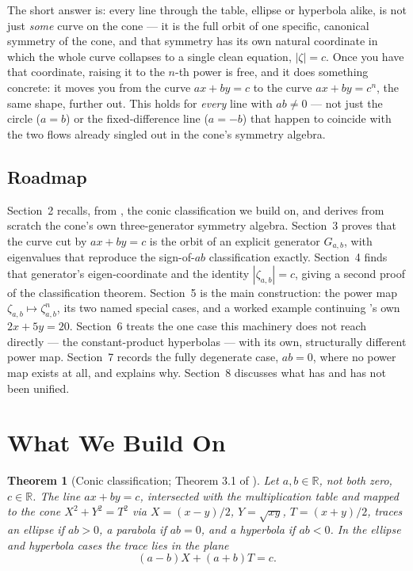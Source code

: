 \documentclass[11pt]{amsart}
\newtheorem{theorem}{Theorem}[section]
\theoremstyle{remark}
\begin{document}
The short answer is: every line through the table, ellipse or hyperbola alike, is not just \emph{some} curve on the cone --- it is the full orbit of one specific, canonical symmetry of the cone, and that symmetry has its own natural coordinate in which the whole curve collapses to a single clean equation, $|\zeta|=c$. Once you have that coordinate, raising it to the $n$-th power is free, and it does something concrete: it moves you from the curve $ax+by=c$ to the curve $ax+by=c^n$, the same shape, further out. This holds for \emph{every} line with $ab\ne0$ --- not just the circle ($a=b$) or the fixed-difference line ($a=-b$) that happen to coincide with the two flows already singled out in the cone's symmetry algebra.

\subsection*{Roadmap} Section~2 recalls, from \cite{Ebert2026Table}, the conic classification we build on, and derives from scratch the cone's own three-generator symmetry algebra. Section~3 proves that the curve cut by $ax+by=c$ is the orbit of an explicit generator $G_{a,b}$, with eigenvalues that reproduce the sign-of-$ab$ classification exactly. Section~4 finds that generator's eigen-coordinate and the identity $|\zeta_{a,b}|=c$, giving a second proof of the classification theorem. Section~5 is the main construction: the power map $\zeta_{a,b}\mapsto\zeta_{a,b}^n$, its two named special cases, and a worked example continuing \cite{Ebert2026Table}'s own $2x+5y=20$. Section~6 treats the one case this machinery does not reach directly --- the constant-product hyperbolas --- with its own, structurally different power map. Section~7 records the fully degenerate case, $ab=0$, where no power map exists at all, and explains why. Section~8 discusses what has and has not been unified.

\section{What We Build On}

\begin{theorem}[Conic classification; Theorem 3.1 of \cite{Ebert2026Table}]\label{thm:conic-recap}
Let $a,b\in\mathbb R$, not both zero, $c\in\mathbb R$. The line $ax+by=c$, intersected with the multiplication table and mapped to the cone $X^2+Y^2=T^2$ via $X=(x-y)/2$, $Y=\sqrt{xy}$, $T=(x+y)/2$, traces an ellipse if $ab>0$, a parabola if $ab=0$, and a hyperbola if $ab<0$. In the ellipse and hyperbola cases the trace lies in the plane
\begin{equation}
(a-b)X+(a+b)T=c. \tag{2.1}
\end{equation}
\end{theorem}
\end{document}
